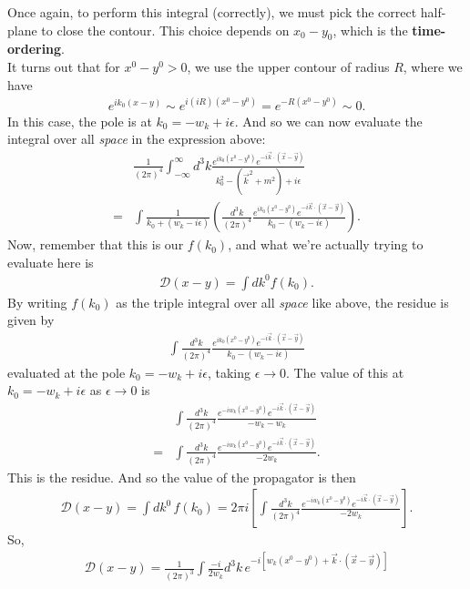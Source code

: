 \documentclass{book}
\theoremstyle{definition}
\newcommand{\f}[2]{\frac{#1}{#2}}
\newcommand{\lp}{\left(}
\newcommand{\rp}{\right)}
\newcommand{\lb}{\left[}
\newcommand{\rb}{\right]}
\newcommand{\D}{\mathcal{D}}
\begin{document}
Once again, to perform this integral (correctly), we must pick the correct half-plane to close the contour. This choice depends on $x_0 - y_0$, which is the \textbf{time-ordering}. \\

It turns out that for $x^0 - y^0 >0$, we use the upper contour of radius $R$, where we have 
\begin{align}
e^{ik_0(x-y)} \sim e^{i(iR)(x^0-y^0)} = e^{-R(x^0-y^0)} \sim 0.
\end{align}
In this case, the pole is at $k_0 = -w_k + i\epsilon$. And so we can now evaluate the integral over all \textit{space} in the expression above:
\begin{align}
&\f{1}{(2\pi)^4}\int^\infty_{-\infty}d^3k\f{e^{ik_0(x^0 - y^0)}e^{-i\vec{k}\cdot(\vec{x} - \vec{y})}}{k_0^2 - (\vec{k}^2 + m^2) + i\epsilon}\\
= &\int \f{1}{k_0 + (w_k - i\epsilon)} \lp 
\f{d^3k}{(2\pi)^4}\f{e^{ik_0(x^0 - y^0)} e^{-i\vec{k}\cdot(\vec{x} - \vec{y})}}{k_0 - (w_k - i\epsilon)}
\rp.
\end{align}
Now, remember that this is our $f(k_0)$, and what we're actually trying to evaluate here is 
\begin{align}
\D(x-y) = \int dk^0 f(k_0).
\end{align}
By writing $f(k_0)$ as the triple integral over all \textit{space} like above, the residue is given by
\begin{align}
\int\f{d^3k}{(2\pi)^4}\f{e^{ik_0(x^0 - y^0)} e^{-i\vec{k}\cdot(\vec{x} - \vec{y})}}{k_0 - (w_k - i\epsilon)}
\end{align}
evaluated at the pole $k_0 = -w_k + i\epsilon$, taking $\epsilon \to 0$. The value of this at $k_0 = -w_k +i\epsilon$ as $\epsilon\to 0$ is
\begin{align}
&\int \f{d^3k}{(2\pi)^4} \f{e^{-iw_k(x^0 - y^0)}e^{-i\vec{k}\cdot (\vec{x} - \vec{y})}}{-w_k - w_k} \\ 
= &\int \f{d^3k}{(2\pi)^4} \f{e^{-iw_k(x^0 - y^0)}e^{-i\vec{k}\cdot (\vec{x} - \vec{y})}}{-2w_k}.
\end{align}
This is the residue. And so the value of the propagator is then
\begin{align}
\D(x-y) = \int dk^0 \,f(k_0) = 2\pi i \lb \int \f{d^3k}{(2\pi)^4} \f{e^{-iw_k(x^0 - y^0)}e^{-i\vec{k}\cdot (\vec{x} - \vec{y})}}{-2w_k} \rb. 
\end{align}
So,
\begin{align}
\D(x-y) = \f{1}{(2\pi)^3} \int \f{-i}{2w_k}d^3k\,e^{-i[w_k(x^0 - y^0) + \vec{k}\cdot(\vec{x} - \vec{y})]}
\end{align}
\end{document}
